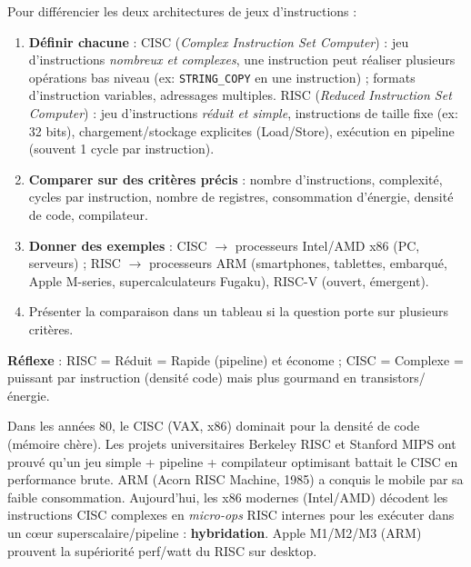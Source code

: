\documentclass[11pt]{article}
\newcommand{\cle}[1]{{\popxbold\color{popdark}#1}}
\newcounter{popsec}
\newcounter{popsub}
\newcommand{\courssub}[1]{%
  \stepcounter{popsub}%
  \par\vspace{9pt}\noindent{\popxbold\fontsize{11.5}{13}\selectfont\color{popink}{\color{poporange}\thepopsec.\thepopsub}\hspace{6pt}#1}\par\nopagebreak\vspace{4pt}
}
\begin{document}
\courssub{Architectures RISC et CISC}

\begin{methode}
Pour différencier les deux architectures de jeux d'instructions :
\begin{enumerate}
\item \textbf{Définir chacune} : \cle{CISC} (\emph{Complex Instruction Set Computer}) : jeu d'instructions \emph{nombreux et complexes}, une instruction peut réaliser plusieurs opérations bas niveau (ex: \texttt{STRING\_COPY} en une instruction) ; formats d'instruction variables, adressages multiples. \cle{RISC} (\emph{Reduced Instruction Set Computer}) : jeu d'instructions \emph{réduit et simple}, instructions de taille fixe (ex: 32 bits), chargement/stockage explicites (Load/Store), exécution en pipeline (souvent 1 cycle par instruction).
\item \textbf{Comparer sur des critères précis} : nombre d'instructions, complexité, cycles par instruction, nombre de registres, consommation d'énergie, densité de code, compilateur.
\item \textbf{Donner des exemples} : CISC $\rightarrow$ processeurs Intel/AMD x86 (PC, serveurs) ; RISC $\rightarrow$ processeurs ARM (smartphones, tablettes, embarqué, Apple M-series, supercalculateurs Fugaku), RISC-V (ouvert, émergent).
\item Présenter la comparaison dans un tableau si la question porte sur plusieurs critères.
\end{enumerate}
\textbf{Réflexe} : RISC = Réduit = Rapide (pipeline) et économe ; CISC = Complexe = puissant par instruction (densité code) mais plus gourmand en transistors/énergie.
\end{methode}

\begin{savaistu}
Dans les années 80, le CISC (VAX, x86) dominait pour la densité de code (mémoire chère). Les projets universitaires Berkeley RISC et Stanford MIPS ont prouvé qu'un jeu simple + pipeline + compilateur optimisant battait le CISC en performance brute. ARM (Acorn RISC Machine, 1985) a conquis le mobile par sa faible consommation. Aujourd'hui, les x86 modernes (Intel/AMD) décodent les instructions CISC complexes en \emph{micro-ops} RISC internes pour les exécuter dans un cœur superscalaire/pipeline : \textbf{hybridation}. Apple M1/M2/M3 (ARM) prouvent la supériorité perf/watt du RISC sur desktop.
\end{savaistu}
\end{document}
